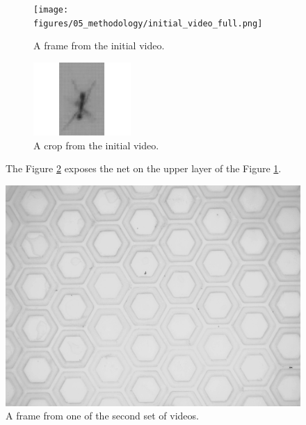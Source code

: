 \begin{figure}[!p]
    \centering
    \begin{subfigure}[b]{0.4\linewidth}
        \texttt{[image: figures/05\_methodology/initial\_video\_full.png]}
        \caption[Frame from the initial video]{\footnotesize{A frame from the initial video.}}
        \label{fig:full frame initial video}
    \end{subfigure}
    \hspace{0.025\linewidth}
    \begin{subfigure}[b]{0.4\linewidth}
        \includegraphics[width=\linewidth]{figures/05_methodology/initial_video_ant.png}
        \caption[Zoom on frame from the initial video]{\footnotesize{A crop from the initial video.}}
        \label{fig:zoom frame initial video}
    \end{subfigure}
    \caption[Frame from the initial video setup]{\footnotesize{The Figure \ref{fig:zoom frame initial video} exposes the net on the upper layer of the Figure \ref{fig:full frame initial video}.}}
    \label{fig:frame initial video}
\end{figure}

\begin{figure}[!p]
    \centering
    \includegraphics[width=0.4\linewidth]{figures/05_methodology/second_video_full.png}
    \caption[Frame from the appearance video setup]{\footnotesize{A frame from one of the second set of videos.}}
    \label{fig:frame second video}
\end{figure}

